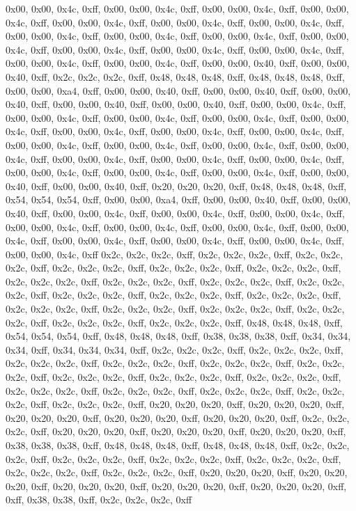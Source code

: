 0x00, 0x00, 0x4c, 0xff, 0x00, 0x00, 0x4c, 0xff, 0x00, 0x00, 0x4c, 0xff, 0x00, 0x00, 0x4c, 0xff, 0x00, 0x00, 0x4c, 0xff, 0x00, 0x00, 0x4c, 0xff, 0x00, 0x00, 0x4c, 0xff, 0x00, 0x00, 0x4c, 0xff, 0x00, 0x00, 0x4c, 0xff, 0x00, 0x00, 0x4c, 0xff, 0x00, 0x00, 0x4c, 0xff, 0x00, 0x00, 0x4c, 0xff, 0x00, 0x00, 0x4c, 0xff, 0x00, 0x00, 0x4c, 0xff, 0x00, 0x00, 0x4c, 0xff, 0x00, 0x00, 0x4c, 0xff, 0x00, 0x00, 0x40, 0xff, 0x00, 0x00, 0x40, 0xff, 0x2c, 0x2c, 0x2c, 0xff, 0x48, 0x48, 0x48, 0xff, 0x48, 0x48, 0x48, 0xff, 0x00, 0x00, 0xa4, 0xff, 0x00, 0x00, 0x40, 0xff, 0x00, 0x00, 0x40, 0xff, 0x00, 0x00, 0x40, 0xff, 0x00, 0x00, 0x40, 0xff, 0x00, 0x00, 0x40, 0xff, 0x00, 0x00, 0x4c, 0xff, 0x00, 0x00, 0x4c, 0xff, 0x00, 0x00, 0x4c, 0xff, 0x00, 0x00, 0x4c, 0xff, 0x00, 0x00, 0x4c, 0xff, 0x00, 0x00, 0x4c, 0xff, 0x00, 0x00, 0x4c, 0xff, 0x00, 0x00, 0x4c, 0xff, 0x00, 0x00, 0x4c, 0xff, 0x00, 0x00, 0x4c, 0xff, 0x00, 0x00, 0x4c, 0xff, 0x00, 0x00, 0x4c, 0xff, 0x00, 0x00, 0x4c, 0xff, 0x00, 0x00, 0x4c, 0xff, 0x00, 0x00, 0x4c, 0xff, 0x00, 0x00, 0x4c, 0xff, 0x00, 0x00, 0x4c, 0xff, 0x00, 0x00, 0x4c, 0xff, 0x00, 0x00, 0x40, 0xff, 0x00, 0x00, 0x40, 0xff, 0x20, 0x20, 0x20, 0xff, 0x48, 0x48, 0x48, 0xff, 0x54, 0x54, 0x54, 0xff, 0x00, 0x00, 0xa4, 0xff, 0x00, 0x00, 0x40, 0xff, 0x00, 0x00, 0x40, 0xff, 0x00, 0x00, 0x4c, 0xff, 0x00, 0x00, 0x4c, 0xff, 0x00, 0x00, 0x4c, 0xff, 0x00, 0x00, 0x4c, 0xff, 0x00, 0x00, 0x4c, 0xff, 0x00, 0x00, 0x4c, 0xff, 0x00, 0x00, 0x4c, 0xff, 0x00, 0x00, 0x4c, 0xff, 0x00, 0x00, 0x4c, 0xff, 0x00, 0x00, 0x4c, 0xff, 0x00, 0x00, 0x4c, 0xff
0x2c, 0x2c, 0x2c, 0xff, 0x2c, 0x2c, 0x2c, 0xff, 0x2c, 0x2c, 0x2c, 0xff, 0x2c, 0x2c, 0x2c, 0xff, 0x2c, 0x2c, 0x2c, 0xff, 0x2c, 0x2c, 0x2c, 0xff, 0x2c, 0x2c, 0x2c, 0xff, 0x2c, 0x2c, 0x2c, 0xff, 0x2c, 0x2c, 0x2c, 0xff, 0x2c, 0x2c, 0x2c, 0xff, 0x2c, 0x2c, 0x2c, 0xff, 0x2c, 0x2c, 0x2c, 0xff, 0x2c, 0x2c, 0x2c, 0xff, 0x2c, 0x2c, 0x2c, 0xff, 0x2c, 0x2c, 0x2c, 0xff, 0x2c, 0x2c, 0x2c, 0xff, 0x2c, 0x2c, 0x2c, 0xff, 0x2c, 0x2c, 0x2c, 0xff, 0x2c, 0x2c, 0x2c, 0xff, 0x48, 0x48, 0x48, 0xff, 0x54, 0x54, 0x54, 0xff, 0x48, 0x48, 0x48, 0xff, 0x38, 0x38, 0x38, 0xff, 0x34, 0x34, 0x34, 0xff, 0x34, 0x34, 0x34, 0xff, 0x2c, 0x2c, 0x2c, 0xff, 0x2c, 0x2c, 0x2c, 0xff, 0x2c, 0x2c, 0x2c, 0xff, 0x2c, 0x2c, 0x2c, 0xff, 0x2c, 0x2c, 0x2c, 0xff, 0x2c, 0x2c, 0x2c, 0xff, 0x2c, 0x2c, 0x2c, 0xff, 0x2c, 0x2c, 0x2c, 0xff, 0x2c, 0x2c, 0x2c, 0xff, 0x2c, 0x2c, 0x2c, 0xff, 0x2c, 0x2c, 0x2c, 0xff, 0x2c, 0x2c, 0x2c, 0xff, 0x2c, 0x2c, 0x2c, 0xff, 0x2c, 0x2c, 0x2c, 0xff, 0x20, 0x20, 0x20, 0xff, 0x20, 0x20, 0x20, 0xff, 0x20, 0x20, 0x20, 0xff, 0x20, 0x20, 0x20, 0xff, 0x20, 0x20, 0x20, 0xff, 0x2c, 0x2c, 0x2c, 0xff, 0x20, 0x20, 0x20, 0xff, 0x20, 0x20, 0x20, 0xff, 0x20, 0x20, 0x20, 0xff, 0x38, 0x38, 0x38, 0xff, 0x48, 0x48, 0x48, 0xff, 0x48, 0x48, 0x48, 0xff, 0x2c, 0x2c, 0x2c, 0xff, 0x2c, 0x2c, 0x2c, 0xff, 0x2c, 0x2c, 0x2c, 0xff, 0x2c, 0x2c, 0x2c, 0xff, 0x2c, 0x2c, 0x2c, 0xff, 0x2c, 0x2c, 0x2c, 0xff, 0x20, 0x20, 0x20, 0xff, 0x20, 0x20, 0x20, 0xff, 0x20, 0x20, 0x20, 0xff, 0x20, 0x20, 0x20, 0xff, 0x20, 0x20, 0x20, 0xff, 0xff, 0x38, 0x38, 0xff, 0x2c, 0x2c, 0x2c, 0xff
